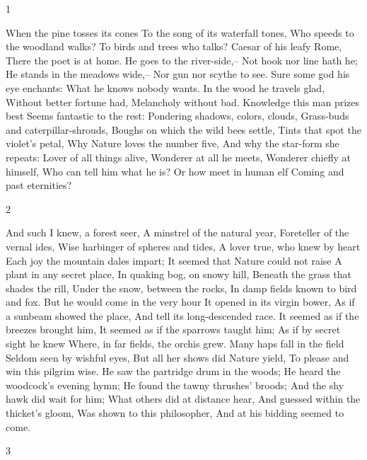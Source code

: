 1

When the pine tosses its cones
To the song of its waterfall tones,
Who speeds to the woodland walks?
To birds and trees who talks?
Caesar of his leafy Rome,
There the poet is at home.
He goes to the river-side,--
Not hook nor line hath he;
He stands in the meadows wide,--
Nor gun nor scythe to see.
Sure some god his eye enchants:
What he knows nobody wants.
In the wood he travels glad,
Without better fortune had,
Melancholy without bad.
Knowledge this man prizes best
Seems fantastic to the rest:
Pondering shadows, colors, clouds,
Grass-buds and caterpillar-shrouds,
Boughs on which the wild bees settle,
Tints that spot the violet's petal,
Why Nature loves the number five,
And why the star-form she repeats:
Lover of all things alive,
Wonderer at all he meets,
Wonderer chiefly at himself,
Who can tell him what he is?
Or how meet in human elf
Coming and past eternities?

2

And such I knew, a forest seer,
A minstrel of the natural year,
Foreteller of the vernal ides,
Wise harbinger of spheres and tides,
A lover true, who knew by heart
Each joy the mountain dales impart;
It seemed that Nature could not raise
A plant in any secret place,
In quaking bog, on snowy hill,
Beneath the grass that shades the rill,
Under the snow, between the rocks,
In damp fields known to bird and fox.
But he would come in the very hour
It opened in its virgin bower,
As if a sunbeam showed the place,
And tell its long-descended race.
It seemed as if the breezes brought him,
It seemed as if the sparrows taught him;
As if by secret sight he knew
Where, in far fields, the orchis grew.
Many haps fall in the field
Seldom seen by wishful eyes,
But all her shows did Nature yield,
To please and win this pilgrim wise.
He saw the partridge drum in the woods;
He heard the woodcock's evening hymn;
He found the tawny thrushes' broods;
And the shy hawk did wait for him;
What others did at distance hear,
And guessed within the thicket's gloom,
Was shown to this philosopher,
And at his bidding seemed to come.

3

